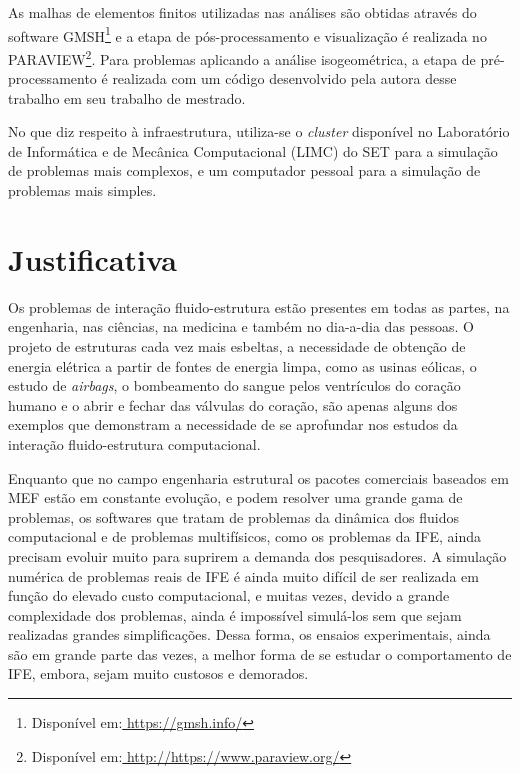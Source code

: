 \documentclass[tese_patricia.tex]{subfiles}
\begin{document}
As malhas de elementos finitos utilizadas nas análises são obtidas através do software GMSH\footnote{Disponível em:\url{ https://gmsh.info/}} e a etapa de pós-processamento e visualização é realizada no PARAVIEW\footnote{Disponível em:\url{ http://https://www.paraview.org/}}. Para problemas aplicando a análise isogeométrica, a etapa de pré-processamento é realizada com um código desenvolvido pela autora desse trabalho em seu trabalho de mestrado.

No que diz respeito à infraestrutura, utiliza-se o \textit{cluster} disponível no Laboratório de Informática e de Mecânica Computacional (LIMC) do SET para a simulação de problemas mais complexos, e um computador pessoal para a simulação de problemas mais simples.

\vspace{-0.8cm}

 \section[Justificativa]{Justificativa}

Os problemas de interação fluido-estrutura estão presentes em todas as partes, na engenharia, nas ciências, na medicina e também no dia-a-dia das pessoas.
O projeto de estruturas cada vez mais esbeltas, a necessidade de obtenção de energia elétrica a partir de fontes de energia limpa, como as usinas eólicas, o estudo de \textit{airbags}, o bombeamento do sangue pelos ventrículos do coração humano e o abrir e fechar das válvulas do coração, são apenas alguns dos exemplos que demonstram a necessidade de se aprofundar nos estudos da interação fluido-estrutura computacional.

Enquanto que no campo engenharia estrutural os pacotes comerciais baseados em MEF estão em constante evolução, e podem resolver uma grande gama de problemas, os softwares que tratam de problemas da dinâmica dos fluidos computacional e de problemas multifísicos, como os problemas da IFE, ainda precisam evoluir muito para suprirem a demanda dos pesquisadores. A simulação numérica de problemas reais de IFE é ainda muito difícil de ser realizada em função do elevado custo computacional, e muitas vezes, devido a grande complexidade dos problemas, ainda é impossível simulá-los sem que sejam realizadas grandes simplificações. Dessa forma, os ensaios experimentais, ainda são em grande parte das vezes, a melhor forma de se estudar o comportamento de IFE, embora, sejam muito custosos e demorados.
\end{document}
